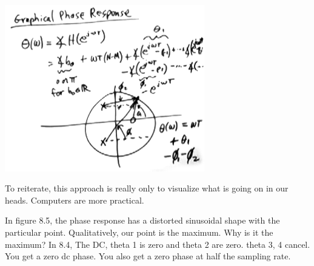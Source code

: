\\
\includegraphics[scale=0.8]{frames/12f}

To reiterate, this approach is really only to visualize what is going on in 
our heads. Computers are more practical.  

In figure 8.5, the phase response has a distorted sinusoidal shape with
the particular point. Qualitatively, our point is the maximum. Why is it the 
maximum? In 8.4, The DC, theta 1 is zero and theta 2 are zero. theta 3, 4 cancel. You
get a zero dc phase. You also get a zero phase at half the sampling rate. 


